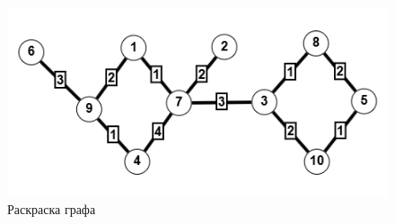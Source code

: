 \documentclass{article}
\begin{document}
\begin{enumerate}
\begin{figure}[ht]
\begin{minipage}[b]{.5\linewidth}
  \end{minipage}
  \hfill
  \begin{minipage}[b]{.5\linewidth}
    \centering
    \includegraphics[width=\textwidth, center]{attachments/7/3.png}
  \end{minipage}
  \caption{Раскраска графа}
  \label{fig:7_colours}
\end{figure}
\end{enumerate}
\end{document}
